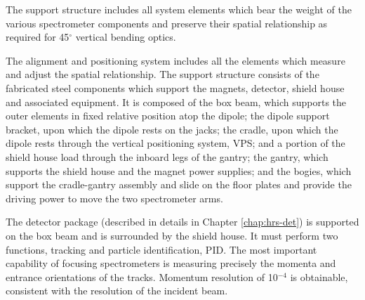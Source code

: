The support structure includes all system elements which bear the weight 
of the various spectrometer components and preserve their spatial 
relationship as required for 45$^{\circ}$ vertical bending optics.

The alignment and positioning system includes all the elements which 
measure and adjust the spatial relationship.  The support structure 
consists of the fabricated steel components which support the magnets, 
detector, shield house and associated equipment.  It is composed of the 
box beam, which supports the outer elements in fixed relative position 
atop the dipole; the dipole support bracket, upon which the dipole rests on 
the jacks; the cradle, upon which the dipole rests through the vertical 
positioning system, VPS; and a portion of the shield house load through 
the inboard legs of the gantry; the gantry, which supports the shield 
house and the magnet power supplies; and the bogies, which support the 
cradle-gantry assembly and slide on the floor plates and provide the 
driving power to move the two spectrometer arms.

The detector package (described in details in Chapter \ref{chap:hrs-det})
is supported on the box beam and is surrounded by 
the shield house.  It must perform two functions, tracking and particle 
identification, PID.  The most important capability of focusing 
spectrometers is measuring precisely the momenta and entrance 
orientations of the tracks.  Momentum resolution of 10$^{-4}$ is 
obtainable, consistent with the resolution of the incident beam.

